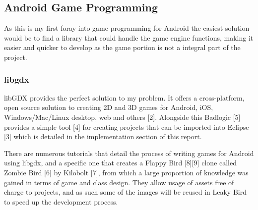 \subsection{Android Game Programming}
As this is my first foray into game programming for Android the easiest solution would be to find a library that could handle the game engine functions, making it easier and quicker to develop as the game portion is not a integral part of the project.

\subsubsection{libgdx}
libGDX provides the perfect solution to my problem. It offers a cross-platform, open source solution to creating 2D and 3D games for Android, iOS, Windows/Mac/Linux desktop, web and others [2]. Alongside this Badlogic [5] provides a simple tool [4] for creating projects that can be imported into Eclipse [3] which is detailed in the implementation section of this report.

There are numerous tutorials that detail the process of writing games for Android using libgdx, and a specific one that creates a Flappy Bird [8][9] clone called Zombie Bird [6] by Kilobolt [7], from which a large proportion of knowledge was gained in terms of game and class design. They allow usage of assets free of charge to projects, and as such some of the images will be reused in Leaky Bird to speed up the development process.
